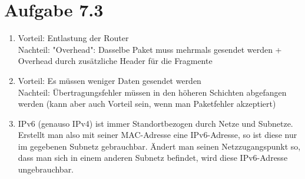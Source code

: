 \documentclass[12pt, a4paper]{article}
\begin{document}


\newpage


\section*{Aufgabe 7.3}
\begin{enumerate}[label=\alph*)]
	\item	Vorteil: Entlastung der Router \\
			Nachteil: "Overhead": Dasselbe Paket muss mehrmals gesendet werden + Overhead durch zusätzliche Header für die Fragmente
	\item	Vorteil: Es müssen weniger Daten gesendet werden \\
			Nachteil: Übertragungsfehler müssen in den höheren Schichten abgefangen werden (kann aber auch Vorteil sein, wenn man Paketfehler akzeptiert)
	\item	IPv6 (genauso IPv4) ist immer Standortbezogen durch Netze und Subnetze. Erstellt man also mit seiner MAC-Adresse eine IPv6-Adresse, so ist diese nur im gegebenen Subnetz gebrauchbar. Ändert man seinen Netzzugangspunkt so, dass man sich in einem anderen Subnetz befindet, wird diese IPv6-Adresse ungebrauchbar.
\end{enumerate}
\end{document}
